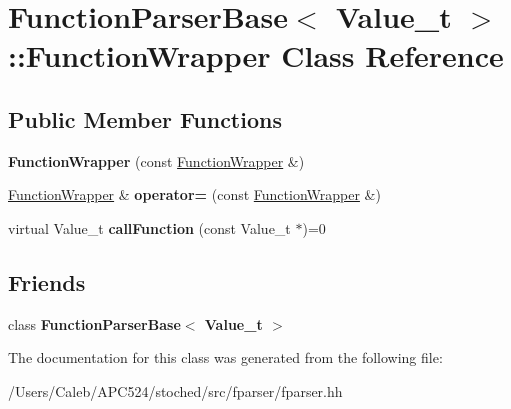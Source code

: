 \hypertarget{class_function_parser_base_1_1_function_wrapper}{}\section{Function\+Parser\+Base$<$ Value\+\_\+t $>$\+:\+:Function\+Wrapper Class Reference}
\label{class_function_parser_base_1_1_function_wrapper}
\subsection*{Public Member Functions}
\begin{DoxyCompactItemize}
\item 
\mbox{\label{class_function_parser_base_1_1_function_wrapper_ac62a6f8dee85a793048083369cd7ee45}} 
{\bfseries Function\+Wrapper} (const \hyperlink{class_function_parser_base_1_1_function_wrapper}{Function\+Wrapper} \&)
\item 
\mbox{\label{class_function_parser_base_1_1_function_wrapper_ac0b4c4d59f00fb5ba7eda55effa6f09b}} 
\hyperlink{class_function_parser_base_1_1_function_wrapper}{Function\+Wrapper} \& {\bfseries operator=} (const \hyperlink{class_function_parser_base_1_1_function_wrapper}{Function\+Wrapper} \&)
\item 
\mbox{\label{class_function_parser_base_1_1_function_wrapper_a5d081e2a2a739ec6936dcf5d9cbc7a64}} 
virtual Value\+\_\+t {\bfseries call\+Function} (const Value\+\_\+t $\ast$)=0
\end{DoxyCompactItemize}
\subsection*{Friends}
\begin{DoxyCompactItemize}
\item 
\mbox{\label{class_function_parser_base_1_1_function_wrapper_a0c2cfe8c970c6fd489bfe42c8fdf45d6}} 
class {\bfseries Function\+Parser\+Base$<$ Value\+\_\+t $>$}
\end{DoxyCompactItemize}


The documentation for this class was generated from the following file\+:\begin{DoxyCompactItemize}
\item 
/\+Users/\+Caleb/\+A\+P\+C524/stoched/src/fparser/fparser.\+hh\end{DoxyCompactItemize}
